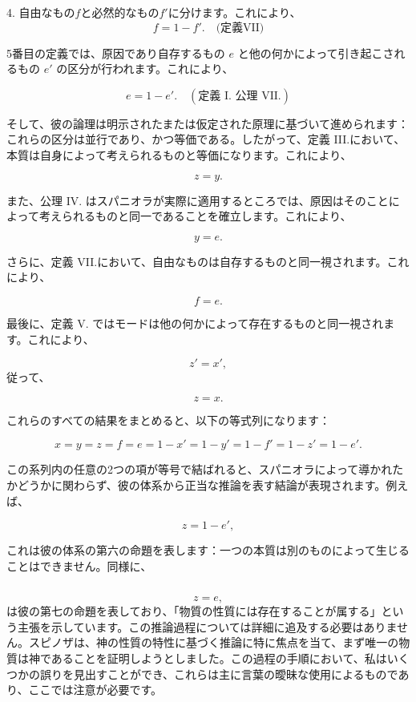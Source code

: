 \documentclass[a4paper,11pt,openany]{ltjsbook}
\begin{document}
4. 自由なもの$f$と必然的なもの$f'$に分けます。これにより、
\[
  f = 1 - f'. \quad \text{(定義VII)}
\]

5番目の定義では、原因であり自存するもの $e$ と他の何かによって引き起こされるもの $e'$ の区分が行われます。これにより、

\[
e = 1 - e'. \quad (\text{定義 I. 公理 VII.})
\]

そして、彼の論理は明示されたまたは仮定された原理に基づいて進められます：これらの区分は並行であり、かつ等価である。したがって、定義 III.において、本質は自身によって考えられるものと等価になります。これにより、

\[
z = y.
\]

また、公理 IV. はスパニオラが実際に適用するところでは、原因はそのことによって考えられるものと同一であることを確立します。これにより、

\[
y = e.
\]

さらに、定義 VII.において、自由なものは自存するものと同一視されます。これにより、

\[
f = e.
\]

最後に、定義 V. ではモードは他の何かによって存在するものと同一視されます。これにより、

\[
z' = x',
\]
従って、

\[
z = x.
\]

これらのすべての結果をまとめると、以下の等式列になります：

\[
x = y = z = f = e = 1 - x' = 1 - y' = 1 - f' = 1 - z' = 1 - e'.
\]

この系列内の任意の2つの項が等号で結ばれると、スパニオラによって導かれたかどうかに関わらず、彼の体系から正当な推論を表す結論が表現されます。例えば、

\[
z = 1 - e',
\]

これは彼の体系の第六の命題を表します：一つの本質は別のものによって生じることはできません。同様に、

\[
\]

$$z = e,$$
は彼の第七の命題を表しており、「物質の性質には存在することが属する」という主張を示しています。この推論過程については詳細に追及する必要はありません。スピノザは、神の性質の特性に基づく推論に特に焦点を当て、まず唯一の物質は神であることを証明しようとしました。この過程の手順において、私はいくつかの誤りを見出すことができ、これらは主に言葉の曖昧な使用によるものであり、ここでは注意が必要です。
\end{document}
